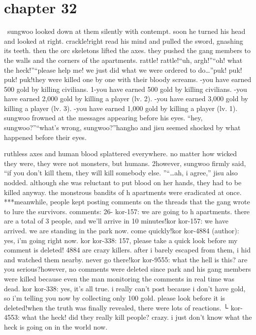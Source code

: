 \section{chapter 32}






 sungwoo looked down at them silently with contempt.
 soon he turned his head and looked at right.
crackle!right read his mind and pulled the sword, gnashing its teeth.
 then the orc skeletons lifted the axes.
 they pushed the gang members to the walls and the corners of the apartments.
rattle! rattle!“uh, argh!”“oh! what the heck!”“please help me! we just did what we were ordered to do…”puk! puk! puk! puk!they were killed one by one with their bloody screams.
-you have earned 500 gold by killing civilians.
1-you have earned 500 gold by killing civilians.
-you have earned 2,000 gold by killing a player (lv.
 2).
-you have earned 3,000 gold by killing a player (lv.
 3).
-you have earned 1,000 gold by killing a player (lv.
 1).
sungwoo frowned at the messages appearing before his eyes.
“hey, sungwoo?”“what’s wrong, sungwoo?”hangho and jisu seemed shocked by what happened before their eyes.

ruthless axes and human blood splattered everywhere.
no matter how wicked they were, they were not monsters, but humans.
2however, sungwoo firmly said, “if you don’t kill them, they will kill somebody else.
”“…ah, i agree,” jisu also nodded.
although she was reluctant to put blood on her hands, they had to be killed anyway.
the monstrous bandits of h apartments were eradicated at once.
***meanwhile, people kept posting comments on the threads that the gang wrote to lure the survivors.
comments: 26- kor-157: we are going to h apartments.
 there are a total of 3 people, and we’ll arrive in 10 minutes!kor kor-157: we have arrived.
 we are standing in the park now.
 come quickly!kor kor-4884 (author): yes, i’m going right now.
kor kor-338: 157, please take a quick look before my comment is deleted! 4884 are crazy killers.
 after i barely escaped from them, i hid and watched them nearby.
 never go there!kor kor-9555: what the hell is this? are you serious?however, no comments were deleted since park and his gang members were killed because even the man monitoring the comments in real time was dead.
kor kor-338: yes, it’s all true.
 i really can’t post because i don’t have gold, so i’m telling you now by collecting only 100 gold.
 please look before it is deleted!when the truth was finally revealed, there were lots of reactions.
└ kor-4553: what the heck! did they really kill people? crazy.
 i just don’t know what the heck is going on in the world now.


